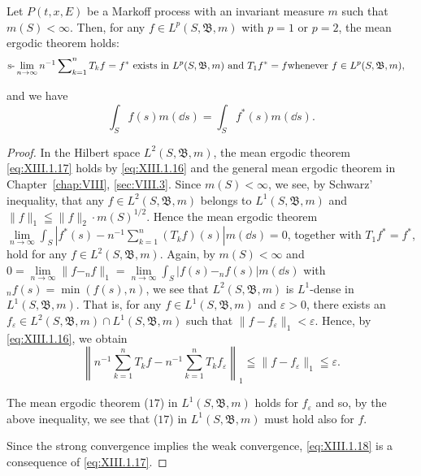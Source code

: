 \begin{theorem}\label{thm:XIII.1.Theorem.2} Let $P(t, x, E)$ be a Markoff process with an invariant measure $m$ such that $m(S) < \infty$. Then, for any $f \in L^p(S, \mathfrak{B}, m)$ with $p = 1$ or $p = 2$, the mean ergodic theorem holds: 
\begin{equation}\label{eq:XIII.1.17}
\begin{aligned}
&\text{s-}\lim _{n \to \infty} n ^{-1} \sum\nolimits_{k=1} ^{n} T _{k} f = f ^{*} \text{ exists in } L ^{p} (S, \mathfrak {B}, m) \text{ and } T _{1} f ^{*} = f \text{whenever } f \in L^{p}(S, \mathfrak{B}, m),
\end{aligned}
\end{equation}


and we have 
\begin{equation}\label{eq:XIII.1.18}
\int_{S} f (s) m (\dd s) = \int_{S} f ^{*} (s) m (\dd s).
\end{equation}
\end{theorem}

\begin{proof}
 In the Hilbert space $L^2(S, \mathfrak{B}, m)$, the mean ergodic theorem \eqref{eq:XIII.1.17} holds by \eqref{eq:XIII.1.16} and the general mean ergodic theorem in Chapter~\ref{chap:VIII}, \ref{sec:VIII.3}. Since $m(S) < \infty$, we see, by Schwarz' inequality, that any $f \in L^2(S, \mathfrak{B}, m)$ belongs to $L^1(S, \mathfrak{B}, m)$ and $\|f\|_1 \leqq \|f\|_2 \cdot m(S)^{1/2}$. Hence the mean ergodic theorem $\lim\limits_{n \to \infty} \int_S |f^*(s) - n^{-1} \sum\limits_{k=1}^{n} (T_k f)(s)|m(\dd s) = 0$, together with $T_1 f^* = f^*$, hold for any $f \in L^2(S, \mathfrak{B}, m)$. Again, by $m(S) < \infty$ and $0 = \lim\limits_{n \to \infty} \|f - _n f\|_1 = \lim\limits_{n \to \infty} \int_S |f(s) - _n f(s)|m(\dd s)$ with $_n f(s) = \min(f(s), n)$, we see that $L^2(S, \mathfrak{B}, m)$ is $L^1$-dense in $L^1(S, \mathfrak{B}, m)$. That is, for any $f \in L^1(S, \mathfrak{B}, m)$ and $\varepsilon > 0$, there exists an $f_\varepsilon \in L^2(S, \mathfrak{B}, m) \cap L^1(S, \mathfrak{B}, m)$ such that $\|f - f_\varepsilon\|_1 < \varepsilon$. Hence, by \eqref{eq:XIII.1.16}, we obtain 
\[
\left\| n ^{-1} \sum\limits_{k=1} ^{n} T _{k} f - n ^{-1} \sum\limits_{k=1} ^{n} T _{k} f _{\varepsilon} \right\| _{1} \leqq \| f - f _{\varepsilon} \| _{1} \leqq \varepsilon . \]

The mean ergodic theorem ($17$) in $L^{1}(S, \mathfrak{B}, m)$ holds for $f_{\varepsilon}$ and so, by the above inequality, we see that ($17$) in $L^{1}(S, \mathfrak{B}, m)$ must hold also for $f$. 

Since the strong convergence implies the weak convergence, \eqref{eq:XIII.1.18} is a consequence of \eqref{eq:XIII.1.17}. 
\end{proof}

